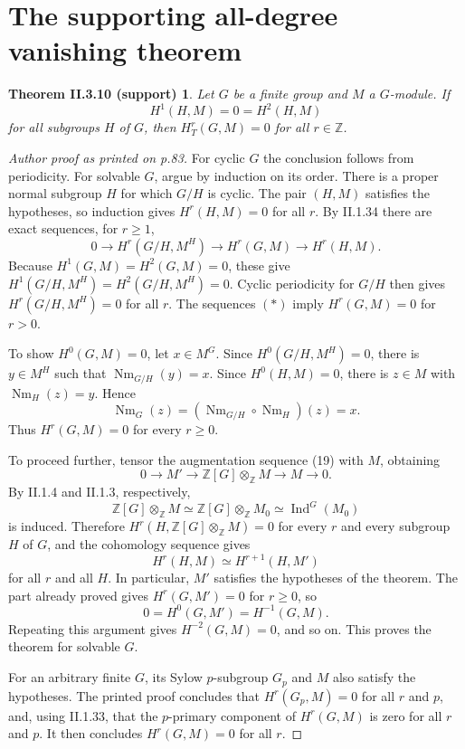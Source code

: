 \documentclass[11pt]{article}
\newcommand{\HT}[2]{H_T^{#1}(#2)}
\newcommand{\Nm}{\operatorname{Nm}}
\newcommand{\Ind}{\operatorname{Ind}}
\newtheorem*{vanishing}{Theorem II.3.10 (support)}
\begin{document}
\section*{The supporting all-degree vanishing theorem}
\begin{vanishing}
Let $G$ be a finite group and $M$ a $G$-module. If
\[
 H^1(H,M)=0=H^2(H,M)
\]
for all subgroups $H$ of $G$, then $\HT{r}{G,M}=0$ for all $r\in\mathbb Z$.
\end{vanishing}
\begin{proof}[Author proof as printed on p.83]
For cyclic $G$ the conclusion follows from periodicity.
For solvable $G$, argue by induction on its order. There is a proper normal
subgroup $H$ for which $G/H$ is cyclic. The pair $(H,M)$ satisfies the
hypotheses, so induction gives $H^r(H,M)=0$ for all $r$. By II.1.34 there are
exact sequences, for $r\geq1$,
\[
 0\longrightarrow H^r(G/H,M^H)\longrightarrow H^r(G,M)
   \longrightarrow H^r(H,M). \tag{*}
\]
Because $H^1(G,M)=H^2(G,M)=0$, these give
$H^1(G/H,M^H)=H^2(G/H,M^H)=0$. Cyclic periodicity for $G/H$ then gives
$H^r(G/H,M^H)=0$ for all $r$. The sequences $(*)$ imply
$H^r(G,M)=0$ for $r>0$.

To show $H^0(G,M)=0$, let $x\in M^G$. Since $H^0(G/H,M^H)=0$, there is
$y\in M^H$ such that $\Nm_{G/H}(y)=x$. Since $H^0(H,M)=0$, there is
$z\in M$ with $\Nm_H(z)=y$. Hence
\[
 \Nm_G(z)=(\Nm_{G/H}\circ\Nm_H)(z)=x.
\]
Thus $H^r(G,M)=0$ for every $r\geq0$.

To proceed further, tensor the augmentation sequence (19) with $M$, obtaining
\[
 0\longrightarrow M'\longrightarrow\mathbb Z[G]\otimes_{\mathbb Z}M
  \longrightarrow M\longrightarrow0.
\]
By II.1.4 and II.1.3, respectively,
\[
 \mathbb Z[G]\otimes_{\mathbb Z}M
 \simeq\mathbb Z[G]\otimes_{\mathbb Z}M_0
 \simeq\Ind^G(M_0)
\]
is induced. Therefore $H^r(H,\mathbb Z[G]\otimes_{\mathbb Z}M)=0$ for every
$r$ and every subgroup $H$ of $G$, and the cohomology sequence gives
\[
 H^r(H,M)\simeq H^{r+1}(H,M')
\]
for all $r$ and all $H$. In particular, $M'$ satisfies the hypotheses of the
theorem. The part already proved gives $H^r(G,M')=0$ for $r\geq0$, so
\[
 0=H^0(G,M')=H^{-1}(G,M).
\]
Repeating this argument gives $H^{-2}(G,M)=0$, and so on. This proves the
theorem for solvable $G$.

For an arbitrary finite $G$, its Sylow $p$-subgroup $G_p$ and $M$ also satisfy
the hypotheses. The printed proof concludes that $H^r(G_p,M)=0$ for all $r$
and $p$, and, using II.1.33, that the $p$-primary component of $H^r(G,M)$
is zero for all $r$ and $p$. It then concludes $H^r(G,M)=0$ for all $r$.
\end{proof}
\end{document}
